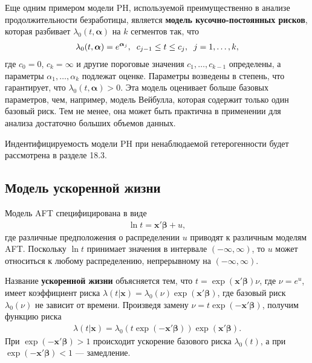 Еще одним примером модели PH, используемой преимущественно в анализе продолжительности безработицы, является \textbf{модель кусочно-постоянных рисков}, которая разбивает $\lambda_0(t,\bm{\alpha})$ на $k$ сегментов так, что
        \begin{align}
        \label{eq:17.22}
        \lambda_0(t,\bm{\alpha})=e^{\bm{\alpha}_j}, \hspace{0.2cm} c_{j-1}\le t\le c_j, \hspace{0.2cm} j=1, \ldots ,k,
        \end{align}
где $c_0=0$, $c_k=\infty$ и другие пороговые значения $c_1, \ldots ,c_{k-1}$ определены, а параметры $\alpha_1, \ldots ,\alpha_k$ подлежат оценке. Параметры возведены в степень, что гарантирует, что $\lambda_0(t,\bm{\alpha})>0.$ Эта модель оценивает больше базовых параметров, чем, например, модель Вейбулла, которая содержит только один базовый риск. Тем не менее, она может быть практична в применении для анализа достаточно больших объемов данных.

Индентифицируемость модели PH при ненаблюдаемой гетерогенности
будет рассмотрена в разделе 18.3. %


\subsection{Модель ускоренной жизни}\label{sec:17.7.2}

\noindent
Модель AFT специфицирована в виде
        \begin{align}
        \label{eq:17.23}
        \ln t=\mathbf{x}'\bm{\beta}+u,
        \end{align}
где различные предположения о распределении $u$ приводят к различным моделям AFT. Поскольку $\ln t$ принимает значения в интервале $(-\infty,\infty)$, то $u$ может относиться к любому распределению, непрерывному на $(-\infty,\infty)$.

Название \textbf{ускоренной жизни} объясняется тем, что $t=\exp(\mathbf{x}'\bm{\beta})\nu$, где $\nu=e^u$, имеет коэффициент риска $\lambda(t|\mathbf{x})=\lambda_0(\nu)\exp(\mathbf{x}'\bm{\beta})$, где базовый риск $\lambda_0(\nu)$ не зависит от времени. Произведя замену $\nu=t\exp(-\mathbf{x}'\bm{\beta})$, получим функцию риска
        \begin{align}
            \label{eq:17.24}
            \lambda(t|\mathbf{x})=\lambda_0(t\exp(-\mathbf{x}'\bm{\beta}))\exp(\mathbf{x}'\bm{\beta}).
        \end{align}
При $\exp(-\mathbf{x}'\bm{\beta})>1$ происходит ускорение базового риска $\lambda_0(t)$, а при $\exp(-\mathbf{x}'\bm{\beta})<1$ --- замедление.

